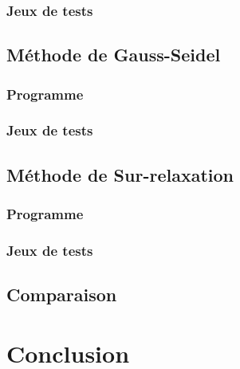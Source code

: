 \documentclass{report}
\begin{document}
      \subsection{Jeux de tests}
  	\newpage
  	\section{Méthode de Gauss-Seidel}
  	  \subsection{Programme}
      \newpage
      \subsection{Jeux de tests}
  	\newpage
  	\section{Méthode de Sur-relaxation}
  	  \subsection{Programme}
        
      \newpage
      \subsection{Jeux de tests}
     \newpage
     \section{Comparaison}
  \chapter*{Conclusion}
  
\end{document}
